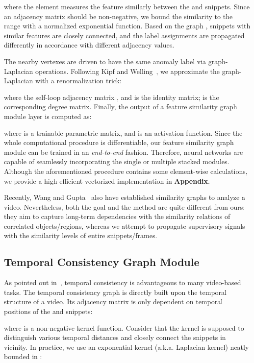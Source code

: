 \documentclass[10pt,twocolumn,letterpaper]{article}
\begin{document}
where the element  measures the feature similarly between the  and  snippets. Since an adjacency matrix should be non-negative, we bound the similarity to the range  with a normalized exponential function. Based on the graph , snippets with similar features are closely connected, and the label assignments are propagated differently in accordance with different adjacency values.

The nearby vertexes are driven to have the same anomaly label via graph-Laplacian operations. Following Kipf and Welling~\cite{Kipf2016Semi}, we approximate the graph-Laplacian with a renormalization trick:

where the self-loop adjacency matrix , and  is the identity matrix;  is the corresponding degree matrix. Finally, the output of a feature similarity graph module layer is computed as:

where  is a trainable parametric matrix, and  is an activation function. Since the whole computational procedure is differentiable, our feature similarity graph module can be trained in an \textit{end-to-end} fashion. Therefore, neural networks are capable of seamlessly incorporating the single or multiple stacked modules. Although the aforementioned procedure contains some element-wise calculations, we provide a high-efficient vectorized implementation in \textbf{Appendix}.

Recently, Wang and Gupta~\cite{Wang_2018_ECCV} also have established similarity graphs to analyze a video. Nevertheless, both the goal and the method are quite different from ours: they aim to capture long-term dependencies with the similarity relations of correlated objects/regions, whereas we attempt to propagate supervisory signals with the similarity levels of entire snippets/frames.

\subsection{Temporal Consistency Graph Module}
As pointed out in~\cite{jayaraman2016slow,mobahi2009deep,wiskott2002slow}, temporal consistency is advantageous to many video-based tasks. The temporal consistency graph  is directly built upon the temporal structure of a video. Its adjacency matrix  is only dependent on temporal positions of the  and  snippets:

where  is a non-negative kernel function. Consider that the kernel is supposed to distinguish various temporal distances and closely connect the snippets in vicinity. In practice, we use an exponential kernel (a.k.a. Laplacian kernel) neatly bounded in :
\end{document}
